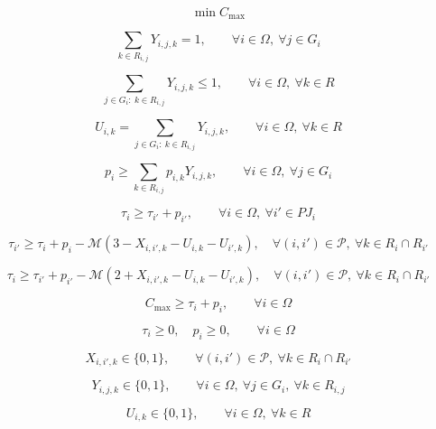 \documentclass{article}
\begin{document}
\begin{equation}
\min C_{\max}
\tag{1}
\end{equation}

\begin{equation}
\sum_{k \in R_{i,j}} Y_{i,j,k} = 1,
\qquad
\forall i \in \Omega,\ \forall j \in G_i
\tag{2}
\end{equation}

\begin{equation}
\sum_{j \in G_i:\ k \in R_{i,j}} Y_{i,j,k} \le 1,
\qquad
\forall i \in \Omega,\ \forall k \in R
\tag{3}
\end{equation}

\begin{equation}
U_{i,k} =
\sum_{j \in G_i:\ k \in R_{i,j}} Y_{i,j,k},
\qquad
\forall i \in \Omega,\ \forall k \in R
\tag{4}
\end{equation}

\begin{equation}
p_i \ge \sum_{k \in R_{i,j}} p_{i,k} Y_{i,j,k},
\qquad
\forall i \in \Omega,\ \forall j \in G_i
\tag{5}
\end{equation}

\begin{equation}
\tau_i \ge \tau_{i'} + p_{i'},
\qquad
\forall i \in \Omega,\ \forall i' \in PJ_i
\tag{6}
\end{equation}

\begin{equation}
\tau_{i'} \ge
\tau_i + p_i
- \mathcal{M}\left(3 - X_{i,i',k} - U_{i,k} - U_{i',k}\right),
\quad
\forall (i,i') \in \mathcal{P},\ \forall k \in R_i \cap R_{i'}
\tag{7}
\end{equation}

\begin{equation}
\tau_i \ge
\tau_{i'} + p_{i'}
- \mathcal{M}\left(2 + X_{i,i',k} - U_{i,k} - U_{i',k}\right),
\quad
\forall (i,i') \in \mathcal{P},\ \forall k \in R_i \cap R_{i'}
\tag{8}
\end{equation}

\begin{equation}
C_{\max} \ge \tau_i + p_i,
\qquad \forall i \in \Omega
\tag{9}
\end{equation}

\begin{equation}
\tau_i \ge 0,\quad p_i \ge 0,
\qquad \forall i \in \Omega
\tag{10}
\end{equation}

\begin{equation}
X_{i,i',k} \in \{0,1\},
\qquad \forall (i,i') \in \mathcal{P},\ \forall k \in R_i \cap R_{i'}
\tag{11}
\end{equation}

\begin{equation}
Y_{i,j,k} \in \{0,1\},
\qquad \forall i \in \Omega,\ \forall j \in G_i,\ \forall k \in R_{i,j}
\tag{12}
\end{equation}

\begin{equation}
U_{i,k} \in \{0,1\},
\qquad \forall i \in \Omega,\ \forall k \in R
\tag{13}
\end{equation}
\end{document}

